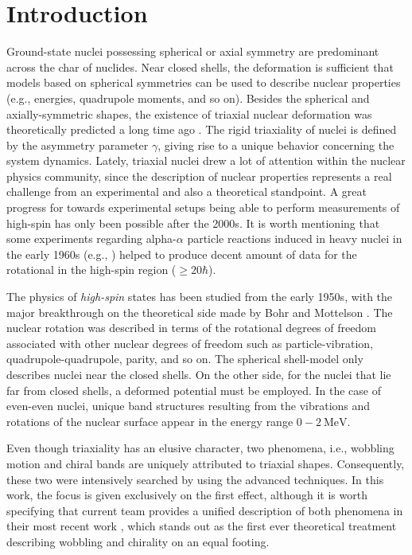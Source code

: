 \chapter{Introduction}

Ground-state nuclei possessing spherical or axial symmetry are predominant across the char of nuclides. Near closed shells, the deformation is sufficient that models based on spherical symmetries can be used to describe nuclear properties (e.g., energies, quadrupole moments, and so on). Besides the spherical and axially-symmetric shapes, the existence of triaxial nuclear deformation was theoretically predicted a long time ago \cite{bohr1998nuclear}. The rigid triaxiality of nuclei is defined by the asymmetry parameter $\gamma$, giving rise to a unique behavior concerning the system dynamics. Lately, triaxial nuclei drew a lot of attention within the nuclear physics community, since the description of nuclear properties represents a real challenge from an experimental and also a theoretical standpoint. A great progress for towards experimental setups being able to perform measurements of high-spin has only been possible after the 2000s. It is worth mentioning that some experiments regarding alpha-$\alpha$ particle reactions induced in heavy nuclei in the early 1960s (e.g., \cite{morinaga1963gamma}) helped to produce decent amount of data for the rotational in the high-spin region ($\geq 20 \hbar$).

The physics of \emph{high-spin} states has been studied from the early 1950s, with the major breakthrough on the theoretical side made by Bohr and Mottelson \cite{bohr1998nuclear}. The nuclear rotation was described in terms of the rotational degrees of freedom associated with other nuclear degrees of freedom such as particle-vibration, quadrupole-quadrupole, parity, and so on. The spherical shell-model only describes nuclei near the closed shells. On the other side, for the nuclei that lie far from closed shells, a deformed potential must be employed. In the case of even-even nuclei, unique band structures resulting from the vibrations and rotations of the nuclear surface appear in the energy range $0-2\ \text{MeV}$.

Even though triaxiality has an elusive character, two phenomena, i.e., wobbling motion and chiral bands are uniquely attributed to triaxial shapes. Consequently, these two were intensively searched by using the advanced techniques. In this work, the focus is given exclusively on the first effect, although it is worth specifying that current team provides a unified description of both phenomena in their most recent work \cite{raduta2022simultaneous}, which stands out as the first ever theoretical treatment describing wobbling and chirality on an equal footing.

